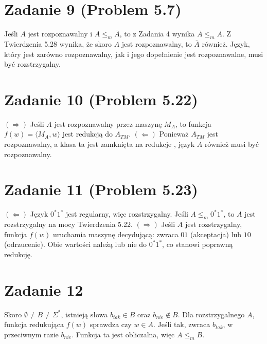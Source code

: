 \documentclass{article}
\begin{document}
\section*{Zadanie 9 (Problem 5.7)}
Jeśli $A$ jest rozpoznawalny i $A \le_m \overline{A}$, to z Zadania 4 wynika $\overline{A} \le_m A$.
Z Twierdzenia 5.28  wynika, że skoro $A$ jest rozpoznawalny, to $\overline{A}$ również.
Język, który jest zarówno rozpoznawalny, jak i jego dopełnienie jest rozpoznawalne, musi być rozstrzygalny.

\section*{Zadanie 10 (Problem 5.22)}
$(\Rightarrow)$ Jeśli $A$ jest rozpoznawalny przez maszynę $M_A$, to funkcja $f(w) = \langle M_A, w \rangle$ jest redukcją do $A_{TM}$.
$(\Leftarrow)$ Ponieważ $A_{TM}$ jest rozpoznawalny, a klasa ta jest zamknięta na redukcje , język $A$ również musi być rozpoznawalny.

\section*{Zadanie 11 (Problem 5.23)}
$(\Leftarrow)$ Język $0^*1^*$ jest regularny, więc rozstrzygalny. Jeśli $A \le_m 0^*1^*$, to $A$ jest rozstrzygalny na mocy Twierdzenia 5.22.
$(\Rightarrow)$ Jeśli $A$ jest rozstrzygalny, funkcja $f(w)$ uruchamia maszynę decydującą: zwraca $01$ (akceptacja) lub $10$ (odrzucenie). Obie wartości należą lub nie do $0^*1^*$, co stanowi poprawną redukcję.

\section*{Zadanie 12}
Skoro $\emptyset \neq B \neq \Sigma^*$, istnieją słowa $b_{tak} \in B$ oraz $b_{nie} \notin B$.
Dla rozstrzygalnego $A$, funkcja redukująca $f(w)$ sprawdza czy $w \in A$. Jeśli tak, zwraca $b_{tak}$, w przeciwnym razie $b_{nie}$. Funkcja ta jest obliczalna, więc $A \le_m B$.
\end{document}
